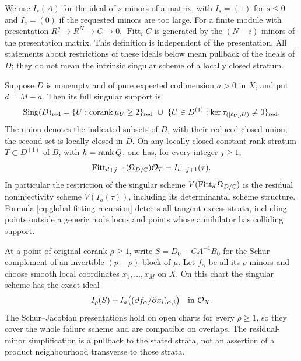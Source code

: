 We use $I_s(A)$ for the ideal of $s$-minors of a matrix, with
$I_s=(1)$ for $s\le0$ and $I_s=(0)$ if the requested minors are too
large. For a finite module with presentation $R^q\to R^N\to C\to0$,
$\operatorname{Fitt}_i C$ is generated by the $(N-i)$-minors of the
presentation matrix. This definition is independent of the presentation.
All statements about restrictions of these ideals below mean pullback
of the ideals of $D$; they do not mean the intrinsic singular scheme
of a locally closed stratum.

\begin{theorem}
\label{thm:global-polar-singularities}
Suppose $D$ is nonempty and of pure expected codimension $a>0$ in $X$,
and put $d=M-a$. Then its full singular support is
\begin{equation}\label{eq:global-singular-support}
 \operatorname{Sing}(D)_{\mathrm{red}}
 =\{U:\operatorname{corank}\mu_U\ge2\}_{\rm red}
  \ \cup\ \{U\in D^{(1)}:\ker\tau_{([\ell_U],U)}\ne0\}_{\rm red}.
\end{equation}
The union denotes the indicated subsets of $D$, with their reduced
closed union; the second set is locally closed in $D$.
On any locally closed constant-rank stratum $T\subset D^{(1)}$ of
$B$, with $h=\operatorname{rank} Q$, one has, for every integer $j\ge1$,
\begin{equation}\label{eq:global-fitting-recursion}
 \operatorname{Fitt}_{d+j-1}(\Omega_{D/\mathbb C})\mathcal O_T
       = I_{h-j+1}(\tau).
\end{equation}
In particular the restriction of the singular scheme
$V(\operatorname{Fitt}_d\Omega_{D/\mathbb C})$ is the residual
noninjectivity scheme $V(I_h(\tau))$, including its determinantal
scheme structure. Formula \eqref{eq:global-fitting-recursion} detects
all tangent-excess strata, including points outside a generic node
locus and points whose annihilator has colliding support.

At a point of original corank $\rho\ge1$, write $S=D_0-CA^{-1}B_0$
for the Schur complement of an invertible $(p-\rho)$-block of $\mu$.
Let $f_\alpha$ be all its $\rho$-minors and choose smooth local
coordinates $x_1,\ldots,x_M$ on $X$. On this chart the singular scheme
has the exact ideal
\begin{equation}\label{eq:schur-singular-scheme}
 I_\rho(S)+I_a\big((\partial f_\alpha/\partial x_i)_{\alpha,i}\big)
       \quad\hbox{in }\mathcal O_X.
\end{equation}
The Schur--Jacobian presentations hold on open charts for every
$\rho\ge1$, so they cover the whole failure scheme and are
compatible on overlaps. The residual-minor simplification is a
pullback to the stated strata, not an assertion of a product
neighbourhood transverse to those strata.
\end{theorem}

